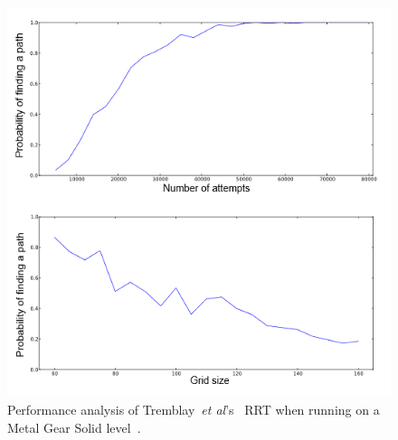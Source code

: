 \documentclass[journal]{IEEEtran}
\begin{document}
\begin{figure}[h]
	\includegraphics[width=1.0\linewidth]{Tremblay2013.png}
	\caption{ Performance analysis of Tremblay~\textit{et al}'s~\cite{Tremblay2013} RRT when running on a Metal Gear Solid level~\cite{game:MetalGearSolid}.}
	\label{TremblayRRT}
\end{figure} 
\end{document}
